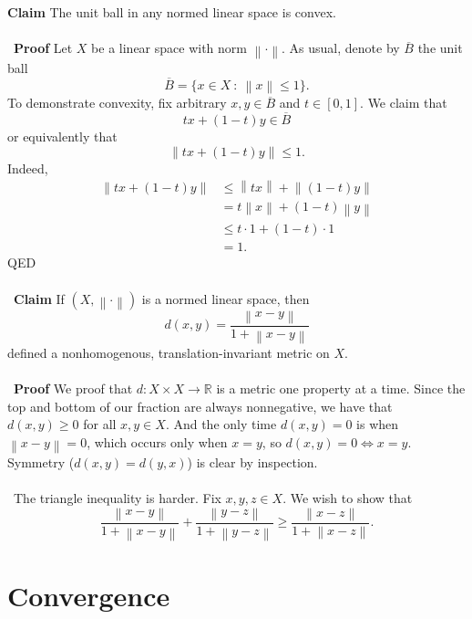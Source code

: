 \documentclass[12 pt]{article}
\newcommand{\R}{\mathbb{R}}
\newcommand{\nm}[1]{\left\| #1 \right\|}
\numberwithin{equation}{section}
\begin{document}
{\textbf{Claim} The unit ball in any normed linear space is convex.\\
\\
\
\textbf{Proof} Let $X$ be a linear space with norm $\nm{\cdot}$. As usual, denote by $\overline{B}$ the unit ball \begin{equation*}
\overline{B} = \{ x \in X \ : \ \nm{x} \leq 1 \}.
\end{equation*}
To demonstrate convexity, fix arbitrary $x, y \in \overline{B}$ and $t \in [0, 1]$. We claim that \begin{equation*}
tx + (1-t)y \in \overline{B}
\end{equation*}
or equivalently that \begin{equation*}
\nm{tx + (1-t)y} \leq 1.
\end{equation*}
Indeed, \begin{align*}
\nm{tx + (1-t)y} & \leq \nm{tx} + \nm{(1-t)y} \\
\ & = t \nm{x} + (1-t) \nm{y} \\
\ & \leq t \cdot 1 + (1-t) \cdot 1 \\
\ & = 1.
\end{align*}
QED\\
\\
\
\textbf{Claim} If $(X, \nm{\cdot})$ is a normed linear space, then \begin{equation*}
d(x,y) = \frac{\nm{x-y}}{1 + \nm{x-y}}
\end{equation*}
defined a nonhomogenous, translation-invariant metric on $X$.\\
\\
\
\textbf{Proof} We proof that $d: X \times X \to \R$ is a metric one property at a time. Since the top and bottom of our fraction are always nonnegative, we have that $d(x,y) \geq 0$ for all $x, y \in X$. And the only time $d(x,y) = 0$ is when $\nm{x-y} = 0$, which occurs only when $x = y$, so $d(x,y) = 0 \iff x = y$. Symmetry ($d(x,y) = d(y,x)$) is clear by inspection.\\
\\
\
The triangle inequality is harder. Fix $x, y, z \in X$. We wish to show that \begin{equation*}
\frac{\nm{x-y}}{1 + \nm{x-y}} + \frac{\nm{y-z}}{1 + \nm{y-z}} \geq \frac{\nm{x-z}}{1 + \nm{x-z}}.
\end{equation*}

\section{Convergence}


}
\end{document}
